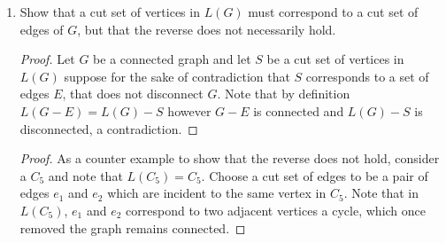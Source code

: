 \documentclass[12pt]{article}
\begin{document}
\begin{enumerate}
\begin{enumerate}
\begin{proof}
		\end{proof}




		\item Show that a cut set of vertices in $L(G)$ must correspond to a cut set of edges of $G$, but that the reverse does not necessarily hold.
		\begin{proof} Let $G$ be a connected graph and let $S$ be a cut set of vertices in $L(G)$ suppose for the sake of contradiction that $S$ corresponds to a set of edges $E$, that does not disconnect $G$. Note that by definition $L(G - E) = L(G) - S$ however $G - E$ is connected and $L(G) - S$ is disconnected, a contradiction. 
		\end{proof}

		\begin{proof} As a counter example to show that the reverse does not hold, consider 
			a $C_5$ and note that $L(C_5) = C_5$. Choose a cut set of edges to be a pair of edges $e_1$ and $e_2$ which are incident to the same vertex in $C_5$. Note that in $L(C_5)$, $e_1$  and $e_2$ correspond to two adjacent vertices a cycle, which once removed the graph remains connected. 
		\end{proof}














		\end{enumerate}
	
\end{enumerate}
\end{document}
